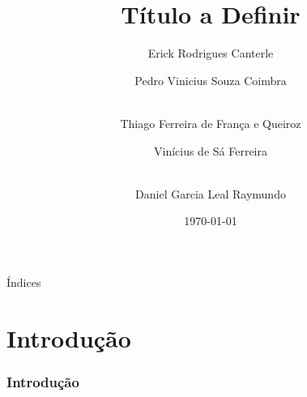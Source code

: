 \documentclass[aspectratio=169,t,xcolor=table]{beamer}
\begin{document}
	
	

\title{Título a Definir}
\author{Erick Rodrigues Canterle  \and  Pedro Vinicius Souza Coimbra \and \\
	Thiago Ferreira de França e Queiroz \and Vinícius de Sá Ferreira  \and \\
	Daniel Garcia Leal Raymundo}

\date{\today}
\frame[noframenumbering]{\titlepage}



\begin{frame}{Índices}
	\tableofcontents
\end{frame}



\section{Introdução}

\begin{frame}
	\frametitle{Introdução}
\end{frame}
\end{document}
